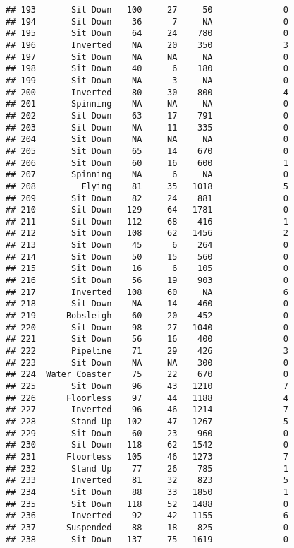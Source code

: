 \documentclass[
]{article}
\begin{document}
\begin{verbatim}
## 193       Sit Down   100     27     50              0
## 194       Sit Down    36      7     NA              0
## 195       Sit Down    64     24    780              0
## 196       Inverted    NA     20    350              3
## 197       Sit Down    NA     NA     NA              0
## 198       Sit Down    40      6    180              0
## 199       Sit Down    NA      3     NA              0
## 200       Inverted    80     30    800              4
## 201       Spinning    NA     NA     NA              0
## 202       Sit Down    63     17    791              0
## 203       Sit Down    NA     11    335              0
## 204       Sit Down    NA     NA     NA              0
## 205       Sit Down    65     14    670              0
## 206       Sit Down    60     16    600              1
## 207       Spinning    NA      6     NA              0
## 208         Flying    81     35   1018              5
## 209       Sit Down    82     24    881              0
## 210       Sit Down   129     64   1781              0
## 211       Sit Down   112     68    416              1
## 212       Sit Down   108     62   1456              2
## 213       Sit Down    45      6    264              0
## 214       Sit Down    50     15    560              0
## 215       Sit Down    16      6    105              0
## 216       Sit Down    56     19    903              0
## 217       Inverted   108     60     NA              6
## 218       Sit Down    NA     14    460              0
## 219      Bobsleigh    60     20    452              0
## 220       Sit Down    98     27   1040              0
## 221       Sit Down    56     16    400              0
## 222       Pipeline    71     29    426              3
## 223       Sit Down    NA     NA    300              0
## 224  Water Coaster    75     22    670              0
## 225       Sit Down    96     43   1210              7
## 226      Floorless    97     44   1188              4
## 227       Inverted    96     46   1214              7
## 228       Stand Up   102     47   1267              5
## 229       Sit Down    60     23    960              0
## 230       Sit Down   118     62   1542              0
## 231      Floorless   105     46   1273              7
## 232       Stand Up    77     26    785              1
## 233       Inverted    81     32    823              5
## 234       Sit Down    88     33   1850              1
## 235       Sit Down   118     52   1488              0
## 236       Inverted    92     42   1155              6
## 237      Suspended    88     18    825              0
## 238       Sit Down   137     75   1619              0

\end{verbatim}
\end{document}
